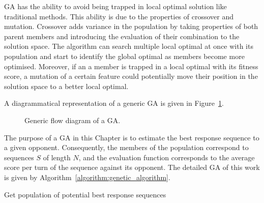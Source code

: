 GA has the ability to avoid being trapped in local optimal solution like
traditional methods. This ability is due to the properties of crossover and
mutation. Crossover adds variance in the population by taking properties of both
parent members and introducing the evaluation of their combination to the
solution space. The algorithm can search multiple local optimal at once with its
population and start to identify the global optimal as members become more
optimised. Moreover, if an a member is trapped in a local optimal with its
fitness score, a mutation of a certain feature could potentially move their
position in the solution space to a better local optimal.

A diagrammatical representation of a generic GA is given in Figure~\ref{fig:ga_flow_diagram}.

\begin{figure}[!htbp]
    \centering
    
    \caption{Generic flow diagram of a GA.}\label{fig:ga_flow_diagram}
\end{figure}

The purpose of a GA in this Chapter is to estimate the best response sequence to
a given opponent. Consequently, the members of the population correspond to
sequences \(S\) of length \(N\), and the evaluation function corresponds to the
average score per turn of the sequence against its opponent. The detailed GA of
this work is given by Algorithm~\ref{algorithm:genetic_algorithm}.

\begin{algorithm}[!htbp]
    \SetAlgoLined
     \caption{Get population of potential best response sequences}\label{algorithm:genetic_algorithm}
\end{algorithm}

